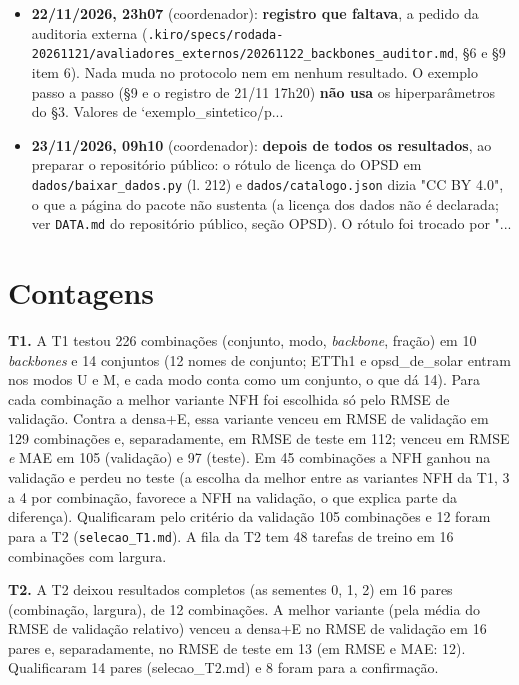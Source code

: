 \documentclass[11pt,a4paper]{article}
\begin{document}
\begin{itemize}
\item \textbf{22/11/2026, 23h07} (coordenador): \textbf{registro que faltava}, a pedido da auditoria externa (\texttt{.\allowbreak{}kiro/\allowbreak{}specs/\allowbreak{}rodada-\allowbreak{}20261121/\allowbreak{}avaliadores\_\allowbreak{}externos/\allowbreak{}20261122\_\allowbreak{}backbones\_\allowbreak{}auditor.\allowbreak{}md}, \S{}6 e \S{}9 item 6). Nada muda no protocolo nem em nenhum resultado. O exemplo passo a passo (\S{}9 e o registro de 21/11 17h20) \textbf{não usa} os hiperparâmetros do \S{}3. Valores de `exemplo\_sintetico/p...
\item \textbf{23/11/2026, 09h10} (coordenador): \textbf{depois de todos os resultados}, ao preparar o repositório público: o rótulo de licença do OPSD em \texttt{dados/\allowbreak{}baixar\_\allowbreak{}dados.\allowbreak{}py} (l. 212) e \texttt{dados/\allowbreak{}catalogo.\allowbreak{}json} dizia "CC BY 4.0", o que a página do pacote não sustenta (a licença dos dados não é declarada; ver \texttt{DATA.\allowbreak{}md} do repositório público, seção OPSD). O rótulo foi trocado por "...
\end{itemize}
\section{Contagens}
\textbf{T1.} A T1 testou 226 combinações (conjunto, modo, \emph{backbone}, fração) em 10 \emph{backbones} e 14 conjuntos (12 nomes de conjunto; ETTh1 e opsd\_de\_solar entram nos modos U e M, e cada modo conta como um conjunto, o que dá 14). Para cada combinação a melhor variante NFH foi escolhida só pelo RMSE de validação. Contra a densa+E, essa variante venceu em RMSE de validação em 129 combinações e, separadamente, em RMSE de teste em 112; venceu em RMSE \emph{e} MAE em 105 (validação) e 97 (teste). Em 45 combinações a NFH ganhou na validação e perdeu no teste (a escolha da melhor entre as variantes NFH da T1, 3 a 4 por combinação, favorece a NFH na validação, o que explica parte da diferença).
 Qualificaram pelo critério da validação 105 combinações e 12 foram para a T2 (\texttt{selecao\_T1.md}).
 A fila da T2 tem 48 tarefas de treino em 16 combinações com largura.


\textbf{T2.} A T2 deixou resultados completos (as sementes 0, 1, 2) em 16 pares (combinação, largura), de 12 combinações. A melhor variante (pela média do RMSE de validação relativo) venceu a densa+E no RMSE de validação em 16 pares e, separadamente, no RMSE de teste em 13 (em RMSE e MAE: 12). Qualificaram 14 pares (selecao\_T2.md)
 e 8 foram para a confirmação.
\end{document}
